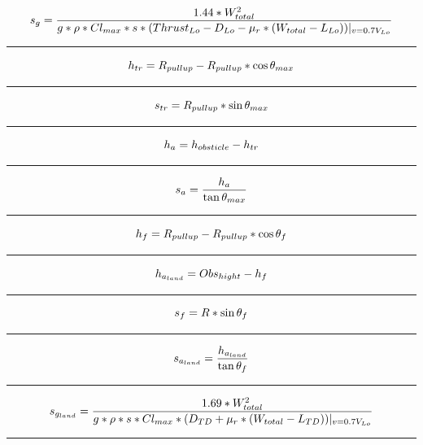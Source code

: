 \documentclass[12pt,A4paper]{article}
\begin{document}
		\vspace{0.1 in}
		\begin{equation}
			s_g = \frac{1.44*W_{total}^2}{g*\rho*Cl_{max}* s * {(Thrust_{Lo} - D_{Lo} - \mu_r*(W_{total}-L_{Lo}))} |_{v=0.7V_{Lo}}} \\
		\end{equation}
		\hrule
		\vspace{0.1 in}
		\begin{equation}
			h_{tr} = R_{pullup} - R_{pullup} * \cos{\theta_{max}} \\
		\end{equation}
		\hrule
		\vspace{0.1 in}
		\begin{equation}
			s_{tr} = R_{pullup} * \sin{\theta_{max}} \\
		\end{equation}
		\hrule
		\vspace{0.1 in}
		\begin{equation}
			h_a = h_{obsticle} - h_{tr} \\
		\end{equation}
		\hrule
		\vspace{0.1 in}
		\begin{equation}
			s_a = \frac{h_a}{\tan{\theta_{max}}} \\
		\end{equation}
		\hrule
		\vspace{0.1 in}
		\begin{equation}
			h_f = R_{pull up} - R_{pull up} * \cos{\theta_f}\\
		\end{equation}
		\hrule
		\vspace{0.1 in}
		\begin{equation}
			h_{a_{land}} = Obs_{hight} - h_f\\
		\end{equation}
		\hrule
		\vspace{0.1 in}
		\begin{equation}
			s_f = R * \sin{\theta_f}\\
		\end{equation}
		\hrule
		\vspace{0.1 in}
		\begin{equation}
			s_{a_{land}} = \frac{h_{a_{land}}}{\tan{\theta_f}}\\
		\end{equation}
		\hrule
		\vspace{0.1 in}
		\begin{equation}
			s_{g_{land}} = \frac{1.69*W_{total}^2}{g*\rho*s*Cl_{max}*(D_{TD} + \mu_r * (W_{total} - L_{TD}))|_{v= 0.7V_{Lo}}}\\
		\end{equation}
		\hrule
		\vspace{0.1 in}
	\clearpage
\end{document}
